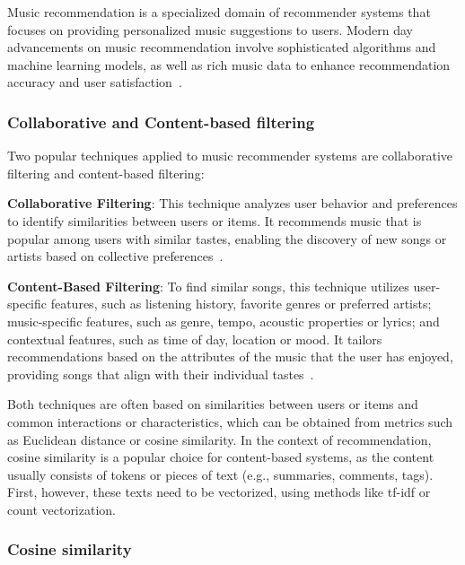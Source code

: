 Music recommendation is a specialized domain of recommender systems that focuses on providing personalized music suggestions to users. Modern day advancements on music recommendation involve sophisticated algorithms and machine learning models, as well as rich music data to enhance recommendation accuracy and user satisfaction~\cite{CHAPTER:RS-HANDBOOK-MUSIC}.

\subsubsection{Collaborative and Content-based filtering}

Two popular techniques applied to music recommender systems are collaborative filtering and content-based filtering:

\begin{compactitem}[\textbullet]
\item \textbf{Collaborative Filtering}: This technique analyzes user behavior and preferences to identify similarities between users or items. It recommends music that is popular among users with similar tastes, enabling the discovery of new songs or artists based on collective preferences~\cite[Chapter 3.1]{CHAPTER:RS-HANDBOOK-MUSIC}.

\item \textbf{Content-Based Filtering}: To find similar songs, this technique utilizes user-specific features, such as listening history, favorite genres or preferred artists; music-specific features, such as genre, tempo, acoustic properties or lyrics; and contextual features, such as time of day, location or mood. It tailors recommendations based on the attributes of the music that the user has enjoyed, providing songs that align with their individual tastes~\cite[Chapter 3.2]{CHAPTER:RS-HANDBOOK-MUSIC}.

\end{compactitem}

Both techniques are often based on similarities between users or items and common interactions or characteristics, which can be obtained from metrics such as Euclidean distance or cosine similarity. In the context of recommendation, cosine similarity is a popular choice for content-based systems, as the content usually consists of tokens or pieces of text (e.g., summaries, comments, tags). First, however, these texts need to be vectorized, using methods like \acs{tf}-\acs{idf} or count vectorization.

\subsubsection{Cosine similarity}

